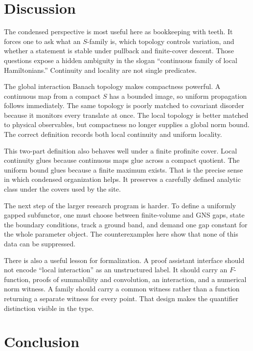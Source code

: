 \documentclass[12pt]{article}
\theoremstyle{definition}
\theoremstyle{remark}
\begin{document}
\section{Discussion}

The condensed perspective is most useful here as bookkeeping with teeth.  It
forces one to ask what an $S$-family is, which topology controls variation,
and whether a statement is stable under pullback and finite-cover descent.
Those questions expose a hidden ambiguity in the slogan ``continuous family
of local Hamiltonians.''  Continuity and locality are not single predicates.

The global interaction Banach topology makes compactness powerful.  A
continuous map from a compact $S$ has a bounded image, so uniform propagation
follows immediately.  The same topology is poorly matched to covariant
disorder because it monitors every translate at once.  The local topology is
better matched to physical observables, but compactness no longer supplies a
global norm bound.  The correct definition records both local continuity and
uniform locality.

This two-part definition also behaves well under a finite profinite cover.
Local continuity glues because continuous maps glue across a compact quotient.
The uniform bound glues because a finite maximum exists.  That is the precise
sense in which condensed organization helps.  It preserves a carefully
defined analytic class under the covers used by the site.

The next step of the larger research program is harder.  To define a
uniformly gapped subfunctor, one must choose between finite-volume and GNS
gaps, state the boundary conditions, track a ground band, and demand one gap
constant for the whole parameter object.  The counterexamples here show that
none of this data can be suppressed.

There is also a useful lesson for formalization.  A proof assistant interface
should not encode ``local interaction'' as an unstructured label.  It should
carry an $F$-function, proofs of summability and convolution, an interaction,
and a numerical norm witness.  A family should carry a common witness rather
than a function returning a separate witness for every point.  That design
makes the quantifier distinction visible in the type.

\section{Conclusion}
\end{document}
